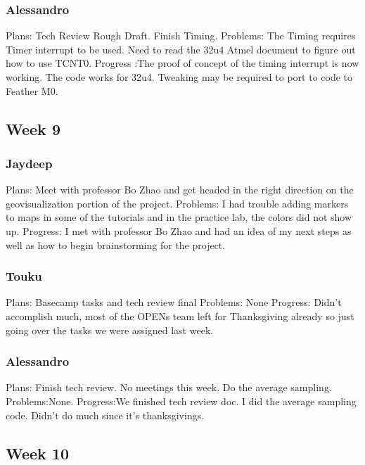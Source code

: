 \documentclass[onecolumn, draftclsnofoot,10pt, compsoc]{IEEEtran}
\begin{document}
\subsubsection{Alessandro}
Plans: 	Tech Review Rough Draft. Finish Timing.
\newline
Problems: The Timing requires Timer interrupt to be used. Need to read the 32u4 Atmel document to figure out how to use TCNT0.
\newline
Progress :The proof of concept of the timing interrupt is now working.
The code works for 32u4. Tweaking may be required to port to code to Feather M0.

\subsection{Week 9}
\subsubsection{Jaydeep}
Plans:  Meet with professor Bo Zhao and get headed in the right direction on the geovisualization portion of the project. 
\newline
Problems: I had trouble adding markers to maps in some of the tutorials and in the practice lab, the colors did not show up. 
\newline
Progress:  I met with professor Bo Zhao and had an idea of my next steps as well as how to begin brainstorming for the project. 

\subsubsection{Touku}
Plans: Basecamp tasks and tech review final
\newline
Problems: None
\newline
Progress: Didn’t accomplish much, most of the OPENs team left for Thanksgiving already so just going over the tasks we were assigned last week.

\subsubsection{Alessandro}
Plans: Finish tech review. No meetings this week. Do the average sampling.
\newline
Problems:None.
\newline
Progress:We finished tech review doc. I did the average sampling code.  Didn’t do much since it’s thanksgivings.


\subsection{Week 10}
\end{document}
